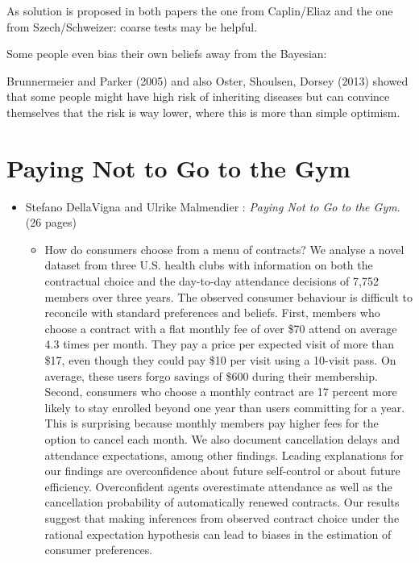 As solution is proposed in both papers the one from Caplin/Eliaz and the one from Szech/Schweizer: coarse tests may be helpful.
~\newline

Some people even bias their own beliefs away from the Bayesian:
 
Brunnermeier and Parker (2005) and also Oster, Shoulsen, Dorsey (2013) showed that some people might have high risk of inheriting diseases but can convince themselves that the risk is way lower, where this is more than simple optimism.

\section{Paying Not to Go to the Gym}
\begin{itemize}
	\item Stefano DellaVigna and Ulrike Malmendier : \textit{Paying Not to Go to the Gym}. (26 pages)
		\begin{itemize}
			\item How do consumers choose from a menu of contracts? We analyse a novel dataset from three U.S. health clubs with information on both the contractual choice and the day-to-day attendance decisions of 7,752 members over three years. The observed consumer behaviour is difficult to reconcile with standard preferences and beliefs. First, members who choose a contract with a flat monthly fee of over \$70 attend on average 4.3 times per month. They pay a price per expected visit of more than \$17, even though they could pay \$10 per visit using a 10-visit pass. On average, these users forgo savings of \$600 during their membership. Second, consumers who choose a monthly contract are 17 percent more likely to stay enrolled beyond one year than users committing for a year. This is surprising because monthly members pay higher fees for the option to cancel each month. We also document cancellation delays and attendance expectations, among other findings. Leading explanations for our findings are overconfidence about future self-control or about future efficiency. Overconfident agents overestimate attendance as well as the cancellation probability of automatically renewed contracts. Our results suggest that making inferences from observed contract choice under the rational expectation hypothesis can lead to biases in the estimation of consumer preferences.
		\end{itemize}
\end{itemize}
		
